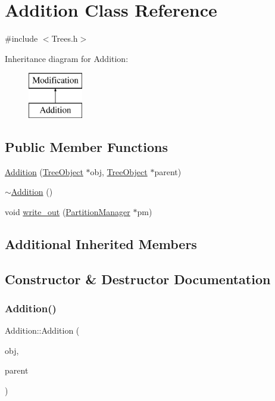 \hypertarget{class_addition}{}\section{Addition Class Reference}
\label{class_addition}


{\ttfamily \#include $<$Trees.\+h$>$}

Inheritance diagram for Addition\+:\begin{figure}[H]
\begin{center}
\leavevmode
\includegraphics[height=2.000000cm]{class_addition}
\end{center}
\end{figure}
\subsection*{Public Member Functions}
\begin{DoxyCompactItemize}
\item 
\mbox{\hyperlink{class_addition_a0bcd6cd605c0e90a834339a1feb20901}{Addition}} (\mbox{\hyperlink{class_tree_object}{Tree\+Object}} $\ast$obj, \mbox{\hyperlink{class_tree_object}{Tree\+Object}} $\ast$parent)
\item 
\mbox{\hyperlink{class_addition_a66f0b31feefaaa51701e78b2a366b840}{$\sim$\+Addition}} ()
\item 
void \mbox{\hyperlink{class_addition_a08cd2dae96a62c80d6fe62339232fbca}{write\+\_\+out}} (\mbox{\hyperlink{class_partition_manager}{Partition\+Manager}} $\ast$pm)
\end{DoxyCompactItemize}
\subsection*{Additional Inherited Members}


\subsection{Constructor \& Destructor Documentation}
\mbox{\label{class_addition_a0bcd6cd605c0e90a834339a1feb20901}} 
\subsubsection{\texorpdfstring{Addition()}{Addition()}}
{\footnotesize\ttfamily Addition\+::\+Addition (\begin{DoxyParamCaption}\item[{\mbox{\hyperlink{class_tree_object}{Tree\+Object}} $\ast$}]{obj,  }\item[{\mbox{\hyperlink{class_tree_object}{Tree\+Object}} $\ast$}]{parent }\end{DoxyParamCaption})}


